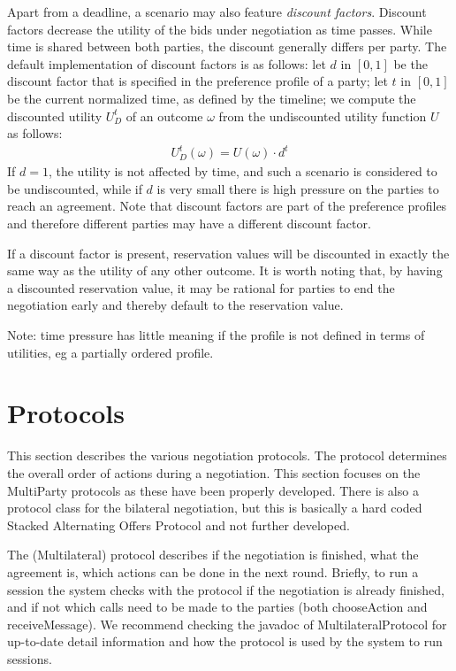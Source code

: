 \documentclass[]{article}
\begin{document}
Apart from a deadline, a scenario may also feature \emph{discount factors}. Discount factors decrease the utility of the bids under negotiation as time passes. While time is shared between both parties, the discount generally differs per party. 
The default implementation of discount factors is as follows: let $d$ in $[0, 1]$ be the discount factor that is specified in the preference profile of a party; let $t$ in $[0, 1]$ be the current normalized time, as defined by the timeline; we compute the discounted utility $U_D^t$ of an outcome $\omega$ from the undiscounted utility function $U$ as follows:
\begin{eqnarray}
U_D^t(\omega) = U(\omega) \cdot d^t
\end{eqnarray}
If $d = 1$, the utility is not affected by time, and such a scenario is considered to be undiscounted, while if $d$ is very small there is high pressure on the parties to reach an agreement. Note that discount factors are part of the preference profiles and therefore different parties may have a different discount factor.

If a discount factor is present, reservation values will be discounted in exactly the same way as the utility of any other outcome. It is worth noting that, by having a discounted reservation value, it may be rational for parties to end the negotiation early and thereby default to the reservation value.

Note: time pressure has little meaning if the profile is not defined in terms of utilities, eg a partially ordered profile.
 
\section{Protocols}\label{sec:protocols}
This section describes the various negotiation protocols. The protocol determines the overall order of actions during a negotiation.
This section focuses on the MultiParty protocols as these have been properly developed. There is also a protocol class for the bilateral negotiation, but this is basically a hard coded Stacked Alternating Offers Protocol and not further developed. 

  The (Multilateral)  protocol describes if the negotiation is finished, what the agreement is, which actions can be done in the next round.   Briefly, to run a session the system checks with the protocol if the negotiation is already finished,  and if not which calls need to be made to the parties (both chooseAction and receiveMessage).  We recommend checking the javadoc of MultilateralProtocol for up-to-date detail information and how the protocol is used by the system to run sessions.
  
\end{document}
